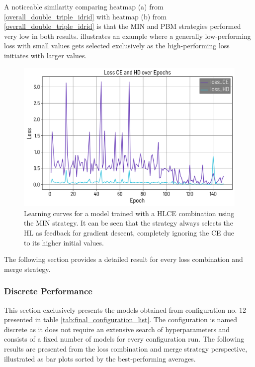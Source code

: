 A noticeable similarity comparing heatmap (a) from \ref{overall_double_triple_idrid} with heatmap (b) from \ref{overall_double_triple_idrid} is that the MIN and PBM strategies performed very low in both results.  illustrates an example where a generally low-performing loss with small values gets selected exclusively as the high-performing loss initiates with larger values.
\begin{figure}[H]%
  \centering
  \includegraphics[width=\imgWidthM]{images/min_strategy_idrid_hd_ce.png}
  \caption[MIN strategy learning curves]{Learning curves for a model trained with a \ac{HL}\ac{CE} combination using the MIN strategy. It can be seen that the strategy always selects the \ac{HL} as feedback for gradient descent, completely ignoring the \ac{CE} due to its higher initial values.}
  \label{min_strategy_idrid_hd_ce}
\end{figure}
The following section provides a detailed result for every loss combination and merge strategy.

\subsubsection*{Discrete Performance}
This section exclusively presents the models obtained from configuration no. 12 presented in table \ref{tab:final_configuration_list}. The configuration is named discrete as it does not require an extensive search of hyperparameters and consists of a fixed number of models for every configuration run. The following results are presented from the loss combination and merge strategy perspective, illustrated as bar plots sorted by the best-performing averages.

